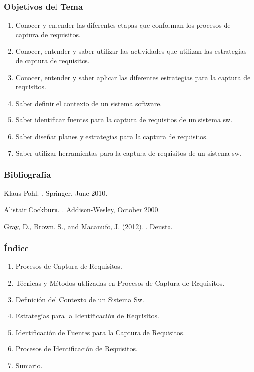 ﻿\documentclass[handout,a4paper,slidestop,xcolor=pst,dvips,blue]{beamer}
\begin{document}
\begin{frame}[c]
    \frametitle{Objetivos del Tema}
    \begin{enumerate}[<+->]
         \item Conocer y entender las diferentes etapas que conforman los procesos de captura de requisitos.
         \item Conocer, entender y saber utilizar las actividades que utilizan las estrategias de captura de requisitos.
         \item Conocer, entender y saber aplicar las diferentes estrategias para la captura de requisitos.
         \item Saber definir el contexto de un sistema software.
         \item Saber identificar fuentes para la captura de requisitos de un sistema sw.
         \item Saber diseñar planes y estrategias para la captura de requisitos.
         \item Saber utilizar herramientas para la captura de requisitos de un sistema sw.
    \end{enumerate}
\end{frame}

\begin{frame}[t]
    \frametitle{Bibliografía}
    \begin{thebibliography}{1}

     Klaus Pohl. .
    \newblock Springer, June 2010.

     Alistair Cockburn. .
    \newblock Addison-Wesley, October 2000.

    Gray, D., Brown, S., and Macanufo, J. (2012).
    .
    \newblock Deusto.
\end{thebibliography}
\end{frame}

\begin{frame}[c]
    \frametitle{Índice}
    \begin{enumerate}
         \item \alert<2->{Procesos de Captura de Requisitos}.
         \item Técnicas y Métodos utilizadas en Procesos de Captura de Requisitos.
         \item Definición del Contexto de un Sistema Sw.
         \item Estrategias para la Identificación de Requisitos.
         \item Identificación de Fuentes para la Captura de Requisitos.
         \item Procesos de Identificación de Requisitos.
         \item Sumario.
    \end{enumerate}
\end{frame}
\end{document}
